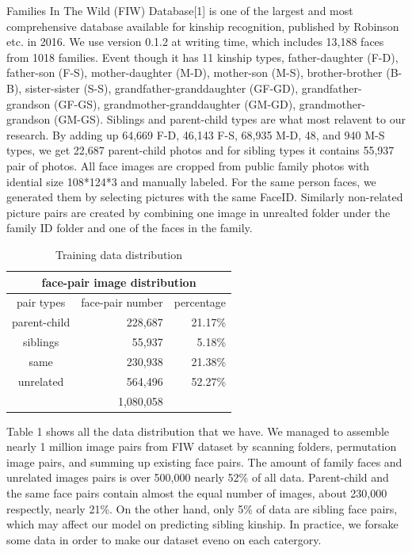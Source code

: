 \documentclass{article}
\begin{document}
Families In The Wild (FIW) Database[1] is one of the largest and most
comprehensive database available for kinship recognition, published by Robinson
etc. in 2016. We use version 0.1.2 at writing time, which includes 13,188 faces
from 1018 families. Event though it has 11 kinship types, father-daughter
(F-D), father-son (F-S), mother-daughter (M-D), mother-son (M-S),
brother-brother (B-B), sister-sister (S-S), grandfather-granddaughter (GF-GD),
grandfather-grandson (GF-GS), grandmother-granddaughter (GM-GD),
grandmother-grandson (GM-GS). Siblings and parent-child types are what most
relavent to our research. By adding up 64,669 F-D, 46,143 F-S, 68,935 M-D, 48,
and 940 M-S types, we get 22,687 parent-child photos and for sibling types it
contains 55,937 pair of photos. All face images are cropped from public family
photos with idential size 108*124*3 and manually labeled. For the same person
faces, we generated them by selecting pictures with the same FaceID. Similarly
non-related picture pairs are created by combining one image in unrealted
folder under the family ID folder and one of the faces in the family.

\begin{table}[h]
	\centering
	\begin{tabular}{ | c || r r | }
		\hline
		\multicolumn{3}{|c|}{face-pair image distribution} \\
		\hline
		pair types&face-pair number&percentage\\
		\hline
			parent-child & 228,687 &21.17\% \\
			siblings & 55,937 & 5.18\% \\
			same & 230,938 & 21.38\% \\
			unrelated & 564,496 & 52.27\% \\
		\hline
			& 1,080,058 & \\
		\hline
	\end{tabular}
	\caption{Training data distribution}
	\label{table:1}
\end{table}

Table 1 shows all the data distribution that we have. We managed to assemble
nearly 1 million image pairs from FIW dataset by scanning folders, permutation
image pairs, and summing up existing face pairs. The amount of family faces and
unrelated images pairs is over 500,000 nearly 52\% of all data. Parent-child
and the same face pairs contain almost the equal number of images, about
230,000 respectly, nearly 21\%.  On the other hand, only 5\% of data are
sibling face pairs, which may affect our model on predicting sibling kinship.
In practice, we forsake some data in order to make our dataset eveno on each
catergory.
\end{document}

